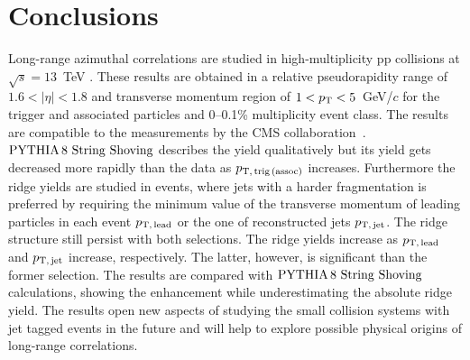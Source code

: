
\section{Conclusions}
\label{sec:summary}
Long-range azimuthal correlations are studied in high-multiplicity pp collisions at $\sqrt{s} = 13$~TeV . These results are obtained in a relative pseudorapidity range of $1.6 < |\eta| < 1.8$ and transverse momentum region of $1 < p_\mathrm{T} < 5$~GeV/$c$ for the trigger and associated particles and 0--0.1\% multiplicity event class. 
The results are compatible to the measurements by the CMS collaboration~\cite{Khachatryan:2015lva}.
$\mathrm{PYTHIA}\,8~\mathrm{String}~\mathrm{Shoving}$ describes the yield qualitatively but its yield gets decreased more rapidly than the data as $p_\mathrm{T,\,trig\,(assoc)}$ increases.
Furthermore the ridge yields are studied in events, where jets with a harder fragmentation is preferred by requiring the minimum value of  the transverse momentum of leading particles in each event $p_\mathrm{T,\,lead}$ or the one of reconstructed jets $p_\mathrm{T,\,jet}$. The ridge structure still persist with both selections. The ridge yields increase as $p_\mathrm{T,\,lead}$ and $p_\mathrm{T,\,jet}$ increase, respectively. The latter, however, is significant than the former selection. The results are compared with $\mathrm{PYTHIA}\,8~\mathrm{String}~\mathrm{Shoving}$ calculations, showing the enhancement while underestimating the absolute ridge yield.
The results open new aspects of studying the small collision systems with jet tagged events in the future and will help to explore possible physical origins of long-range correlations.